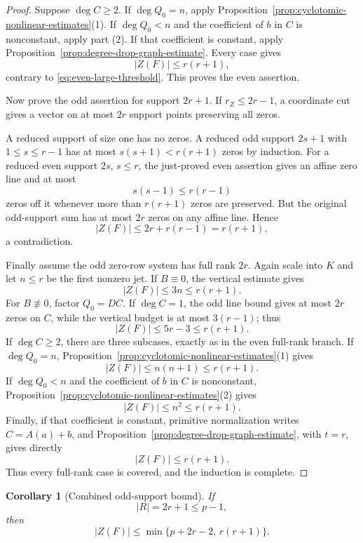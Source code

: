 \documentclass[11pt]{article}
\newtheorem{corollary}[theorem]{Corollary}
\begin{document}
\begin{proof}
Suppose \(\deg C\ge2\).  If \(\deg Q_0=n\), apply
Proposition~\ref{prop:cyclotomic-nonlinear-estimates}(1).
If \(\deg Q_0<n\) and the coefficient of \(b\) in \(C\) is
nonconstant, apply part (2).  If that coefficient is constant, apply
Proposition~\ref{prop:degree-drop-graph-estimate}.  Every case gives
\[
 |Z(F)|\le r(r+1),
\]
contrary to \eqref{eq:even-large-threshold}.  This proves the even
assertion.

Now prove the odd assertion for support \(2r+1\).
If \(r_Z\le2r-1\), a coordinate cut gives a vector on at most \(2r\)
support points preserving all zeros.

A reduced support of size one has no zeros.  A reduced odd support
\(2s+1\) with \(1\le s\le r-1\) has at most
\(s(s+1)<r(r+1)\) zeros by induction.
For a reduced even support \(2s\), \(s\le r\), the just-proved even
assertion gives an affine zero line and at most
\[
 s(s-1)\le r(r-1)
\]
zeros off it whenever more than \(r(r+1)\) zeros are preserved.
But the original odd-support sum has at most \(2r\) zeros on any
affine line.  Hence
\[
 |Z(F)|
 \le
 2r+r(r-1)
 =
 r(r+1),
\]
a contradiction.

Finally assume the odd zero-row system has full rank \(2r\).
Again scale into \(K\) and let \(n\le r\) be the first nonzero jet.
If \(B\equiv0\), the vertical estimate gives
\[
 |Z(F)|\le3n\le r(r+1).
\]
For \(B\not\equiv0\), factor \(Q_0=D C\).
If \(\deg C=1\), the odd line bound gives at most \(2r\) zeros on
\(C\), while the vertical budget is at most \(3(r-1)\); thus
\[
 |Z(F)|\le5r-3\le r(r+1).
\]
If \(\deg C\ge2\), there are three subcases, exactly as in the even
full-rank branch.  If \(\deg Q_0=n\),
Proposition~\ref{prop:cyclotomic-nonlinear-estimates}(1) gives
\[
 |Z(F)|\le n(n+1)\le r(r+1).
\]
If \(\deg Q_0<n\) and the coefficient of \(b\) in \(C\) is
nonconstant, Proposition~\ref{prop:cyclotomic-nonlinear-estimates}(2) gives
\[
 |Z(F)|\le n^2\le r(r+1).
\]
Finally, if that coefficient is constant, primitive normalization writes
\(C=A(a)+b\), and Proposition~\ref{prop:degree-drop-graph-estimate},
with \(t=r\), gives directly
\[
 |Z(F)|\le r(r+1).
\]
Thus every full-rank case is covered, and the induction is complete.
\end{proof}

\begin{corollary}[Combined odd-support bound]
\label{cor:combined-odd-support}
If
\[
 |R|=2r+1\le p-1,
\]
then
\begin{equation}
 \boxed{
 |Z(F)|
 \le
 \min\bigl\{
 p+2r-2,\,
 r(r+1)
 \bigr\}.
 }
 \label{eq:combined-odd-support}
\end{equation}
\end{corollary}
\end{document}
